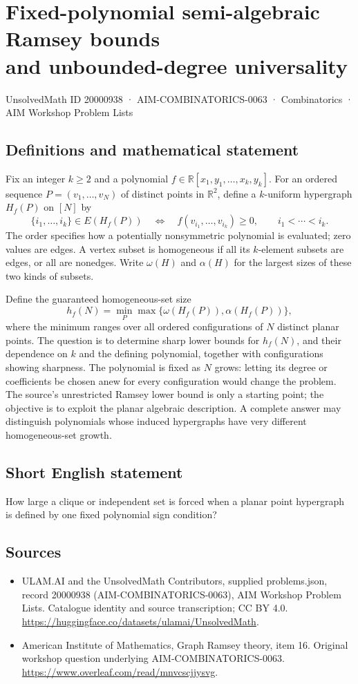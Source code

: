 \documentclass[11pt,a4paper]{article}
\begin{document}
\section*{Fixed-polynomial semi-algebraic Ramsey bounds\\ and unbounded-degree universality}\label{20000938}
{\small UnsolvedMath ID 20000938 · AIM-COMBINATORICS-0063 · Combinatorics · AIM Workshop Problem Lists}
\subsection{Definitions and mathematical statement}
Fix an integer $k\geq2$ and a polynomial $f\in\mathbb R[x_1,y_1,\ldots,x_k,y_k]$.
For an ordered sequence $P=(v_1,\ldots,v_N)$ of distinct points in $\mathbb R^2$, define a $k$-uniform hypergraph $H_f(P)$ on $[N]$ by
\[
 \{i_1,\ldots,i_k\}\in E(H_f(P))
 \quad\Longleftrightarrow\quad
 f(v_{i_1},\ldots,v_{i_k})\geq0,
 \qquad i_1<\cdots<i_k.
\]
The order specifies how a potentially nonsymmetric polynomial is evaluated; zero values are edges.
A vertex subset is homogeneous if all its $k$-element subsets are edges, or all are nonedges.
Write $\omega(H)$ and $\alpha(H)$ for the largest sizes of these two kinds of subsets.

Define the guaranteed homogeneous-set size
\[
 h_f(N)=\min_P\max\{\omega(H_f(P)),\alpha(H_f(P))\},
\]
where the minimum ranges over all ordered configurations of $N$ distinct planar points.
The question is to determine sharp lower bounds for $h_f(N)$, and their dependence on $k$ and the defining polynomial, together with configurations showing sharpness.
The polynomial is fixed as $N$ grows: letting its degree or coefficients be chosen anew for every configuration would change the problem.
The source's unrestricted Ramsey lower bound is only a starting point; the objective is to exploit the planar algebraic description.
A complete answer may distinguish polynomials whose induced hypergraphs have very different homogeneous-set growth.
\subsection{Short English statement}
How large a clique or independent set is forced when a planar point hypergraph is defined by one fixed polynomial sign condition?
\subsection{Sources}
\begin{itemize}
\item[S1] ULAM.AI and the UnsolvedMath Contributors, supplied problems.json, record 20000938 (AIM-COMBINATORICS-0063), AIM Workshop Problem Lists. Catalogue identity and source transcription; CC BY 4.0.
\url{https://huggingface.co/datasets/ulamai/UnsolvedMath}.
\item[S2] American Institute of Mathematics, Graph Ramsey theory, item 16. Original workshop question underlying AIM-COMBINATORICS-0063.
\url{https://www.overleaf.com/read/mnvcscjjysvg}.
\end{itemize}
\end{document}
